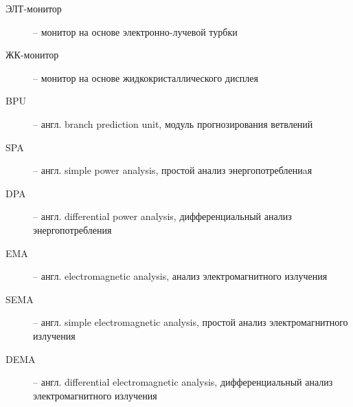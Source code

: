 
\begin{description}
\item[ЭЛТ-монитор] -- монитор на основе электронно-лучевой турбки
\item[ЖК-монитор] -- монитор на основе жидкокристаллического дисплея
\item[BPU] -- англ. branch prediction unit, модуль прогнозирования ветвлений
\item[SPA] -- англ. simple power analysis, простой анализ энергопотреблениaя
\item[DPA] -- англ. differential power analysis, дифференциальный анализ
  энергопотребления
\item[EMA] -- англ. electromagnetic analysis, анализ электромагнитного
  излучения
\item[SEMA] -- англ. simple electromagnetic analysis, простой анализ
  электромагнитного излучения
\item[DEMA] -- англ. differential electromagnetic analysis, дифференциальный
  анализ электромагнитного излучения
\end{description}

\clearpage


\clearpage

